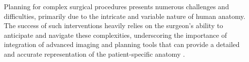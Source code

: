 \documentclass[sn-mathphys-num]{sn-jnl}%
\theoremstyle{thmstyleone}%
\theoremstyle{thmstyletwo}%
\theoremstyle{thmstylethree}%
\begin{document}
% 
% 
% 




\maketitle

Planning for complex surgical procedures presents numerous challenges and difficulties, primarily due to the intricate and variable nature of human anatomy. The success of such interventions heavily relies on the surgeon's ability to anticipate and navigate these complexities, underscoring the importance of integration of advanced imaging and planning tools that can provide a detailed and accurate representation of the patient-specific anatomy \cite{RN30}.
\end{document}
